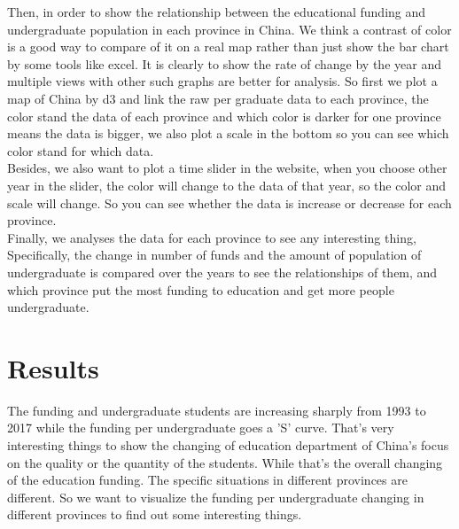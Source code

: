 \noindent Then, in order to show the relationship between the educational funding and undergraduate population in each province in China. We think a contrast of color is a good way to compare of it on a real map rather than just show the bar chart by some tools like excel. It is clearly to show the rate of change by the year and multiple views with other such graphs are better for analysis. So first we plot a map of China by d3 and link the raw per graduate data to each province, the color stand the data of each province and which color is darker for one province means the data is bigger, we also plot a scale in the bottom so you can see which color stand for which data. \\

\noindent Besides, we also want to plot a time slider in the website, when you choose other year in the slider, the color will change to the data of that year, so the color and scale will change. So you can see whether the data is increase or decrease for each province.\\

\noindent Finally, we analyses the data for each province to see any interesting thing, Specifically, the change in number of funds and the amount of population of undergraduate is compared over the years to see the relationships of them, and which province put the most funding to education and get more people undergraduate.

\timeline

\section{Results}
\label{sec:results}

\map

The funding and undergraduate students are increasing sharply from 1993 to 2017 while the funding per undergraduate goes a 'S' curve. That's very interesting things to show the changing of education department of China's focus on the quality or the quantity of the students. While that's the overall changing of the education funding. The specific situations in different provinces are different. So we want to visualize the funding per undergraduate changing in different provinces to find out some interesting things.

